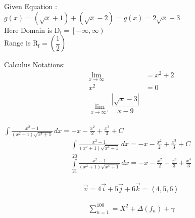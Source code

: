 \documentclass[12pt]{article}
\begin{document}
Given Equation : \\[1cm]
$ \displaystyle{g(x) = (\sqrt{x}+1)+(\sqrt{x}-2) =  g(x) = 2\sqrt{x}+3} $\\
Here Domain is $ \mathrm{D_f} = \left[-\infty,\infty\right) $\\
Range is $ \mathrm{R_f} = \left(\dfrac{1}{2} \right) $ 

\vfill
Calculus Notations:
\begin{align}
\lim \limits_{x \to \infty} &=  x^2+2 \\
x^2&=0\\
\lim \limits_{x \to \infty^+} \dfrac{\left|\sqrt{x}-3\right|}{x-9}\\
\end{align}

$\int \frac{x^2-1}{(x^2+1)\sqrt{x^4+1}} \,dx = -x-\frac{x^2}{2}+\frac{x^3}{3} +C$\\[1cm]


\begin{align}
\int \frac{x^2-1}{(x^2+1)\sqrt{x^4+1}} \,dx = -x-\frac{x^2}{2}+\frac{x^3}{3} +C \\[0.5cm]
\int \limits_{21}^{20} \frac{x^2-1}{(x^2+1)\sqrt{x^4+1}} \,dx = -x-\frac{x^2}{2}+\frac{x^3}{3}+\frac{x^3}{3}
\end{align}


\begin{align}
\vec{v} = 4\vec{i} + 5\vec{j}+6\vec{k} = \left\langle 4,5,6 \right\rangle
\end{align}

\begin{align}
\sum \limits_{n=1}^{100} = X^2+\Delta(f_n)+\gamma
\end{align}
\end{document}
